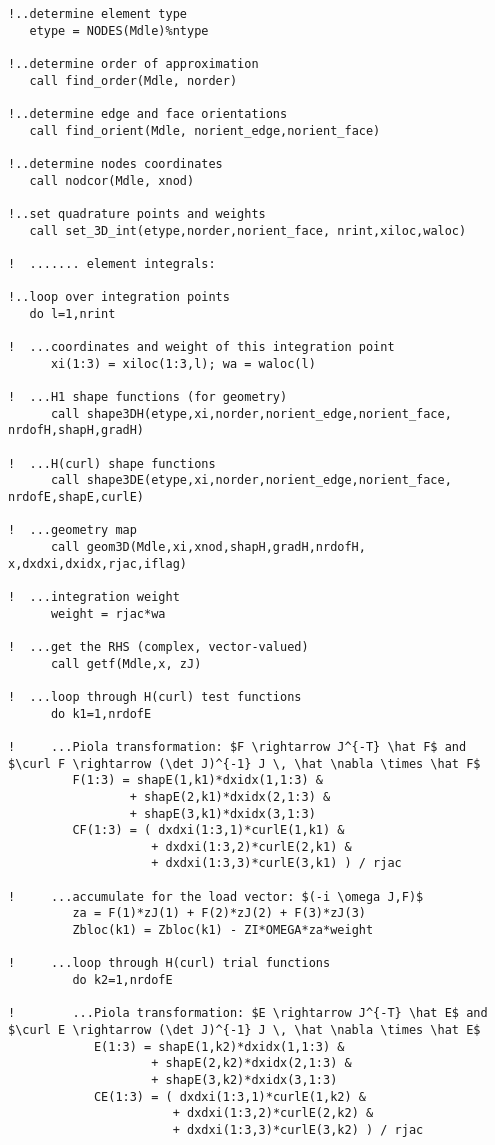 \begin{lstlisting}[mathescape,caption=\file{MAXWELL/GALERKIN/}\routine{elem} routine]
!..determine element type
   etype = NODES(Mdle)%ntype
   
!..determine order of approximation
   call find_order(Mdle, norder)
   
!..determine edge and face orientations
   call find_orient(Mdle, norient_edge,norient_face)
   
!..determine nodes coordinates
   call nodcor(Mdle, xnod)
   
!..set quadrature points and weights
   call set_3D_int(etype,norder,norient_face, nrint,xiloc,waloc)

!  ....... element integrals:

!..loop over integration points
   do l=1,nrint

!  ...coordinates and weight of this integration point
      xi(1:3) = xiloc(1:3,l); wa = waloc(l)

!  ...H1 shape functions (for geometry)
      call shape3DH(etype,xi,norder,norient_edge,norient_face, nrdofH,shapH,gradH)

!  ...H(curl) shape functions
      call shape3DE(etype,xi,norder,norient_edge,norient_face, nrdofE,shapE,curlE)

!  ...geometry map
      call geom3D(Mdle,xi,xnod,shapH,gradH,nrdofH, x,dxdxi,dxidx,rjac,iflag)

!  ...integration weight
      weight = rjac*wa

!  ...get the RHS (complex, vector-valued)
      call getf(Mdle,x, zJ)

!  ...loop through H(curl) test functions
      do k1=1,nrdofE

!     ...Piola transformation: $F \rightarrow J^{-T} \hat F$ and $\curl F \rightarrow (\det J)^{-1} J \, \hat \nabla \times \hat F$
         F(1:3) = shapE(1,k1)*dxidx(1,1:3) &
                 + shapE(2,k1)*dxidx(2,1:3) &
                 + shapE(3,k1)*dxidx(3,1:3)
         CF(1:3) = ( dxdxi(1:3,1)*curlE(1,k1) &
                    + dxdxi(1:3,2)*curlE(2,k1) &
                    + dxdxi(1:3,3)*curlE(3,k1) ) / rjac

!     ...accumulate for the load vector: $(-i \omega J,F)$
         za = F(1)*zJ(1) + F(2)*zJ(2) + F(3)*zJ(3)
         Zbloc(k1) = Zbloc(k1) - ZI*OMEGA*za*weight

!     ...loop through H(curl) trial functions
         do k2=1,nrdofE

!        ...Piola transformation: $E \rightarrow J^{-T} \hat E$ and $\curl E \rightarrow (\det J)^{-1} J \, \hat \nabla \times \hat E$
            E(1:3) = shapE(1,k2)*dxidx(1,1:3) &
                    + shapE(2,k2)*dxidx(2,1:3) &
                    + shapE(3,k2)*dxidx(3,1:3)
            CE(1:3) = ( dxdxi(1:3,1)*curlE(1,k2) &
                       + dxdxi(1:3,2)*curlE(2,k2) &
                       + dxdxi(1:3,3)*curlE(3,k2) ) / rjac


\end{lstlisting}
